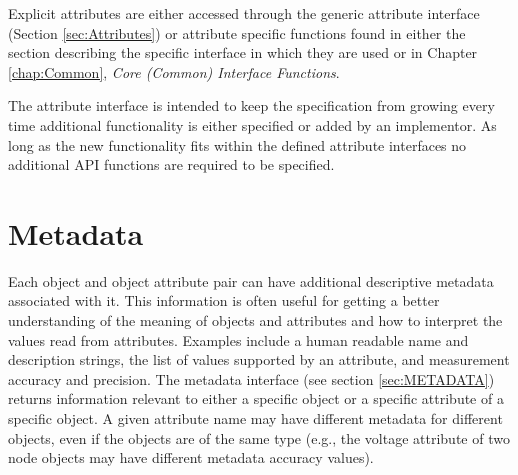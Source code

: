 Explicit attributes are either accessed through the generic attribute interface (Section \ref{sec:Attributes}) or attribute specific functions found in either the section describing the specific interface in which they are used or in Chapter \ref{chap:Common}, \textit{Core (Common) Interface Functions}.

The attribute interface is intended to keep the specification from growing every time additional functionality is either specified or added by an implementor. 
As long as the new functionality fits within the defined attribute interfaces no additional API functions are required to be specified.

\section{Metadata}\label{sec:TheoryMetadata}
Each object and object attribute pair can have additional descriptive metadata associated with it.
This information is often useful for getting a better understanding of the meaning of objects and attributes and how to interpret the values read from attributes.
Examples include a human readable name and description strings, the list of values supported by an attribute, and measurement accuracy and precision.
The metadata interface (see section \ref{sec:METADATA}) returns information relevant to either a specific object or a specific attribute of a specific object.
A given attribute name may have different metadata for different objects, even if the objects are of the same type (e.g., the voltage attribute of two node objects may have different metadata accuracy values).


